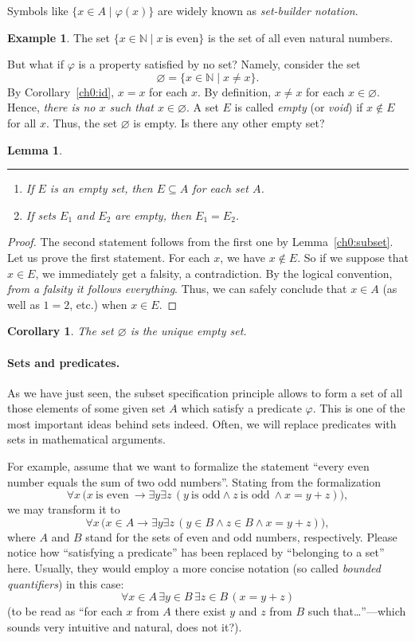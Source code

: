 \documentclass[12pt,notitlepage]{article}
\theoremstyle{plain}
\newtheorem{lemma}[thm]{Lemma}
\newtheorem{corr}[thm]{Corollary}
\theoremstyle{definition}
\newtheorem{exm}[thm]{Example}
\theoremstyle{plain}
\newcommand{\N}{\mathbb{N}}
\newcommand{\sbs}{\subseteq}
\newcommand{\void}{\varnothing}
\renewcommand{\phi}{\varphi}
\newcommand{\1}{\mathbf{1}}
\newcommand{\0}{\mathbf{0}}
\begin{document}
Symbols like $\{x \in A \mid \phi(x)\}$ are widely known as \emph{set-builder notation}.

\begin{exm}
The set
$\{ x \in \N \mid x\ \mbox{is even} \}$
is the set of all even natural numbers.
\end{exm}

But what if $\phi$ is a property satisfied by no set? Namely, consider the set
$$\void = \{ x \in \N \mid x \neq x \}.$$
By Corollary~\ref{ch0:id}, $x = x$ for each $x$. By definition, $x \neq x$ for each $x \in \void$. Hence, \emph{there is no $x$ such that $x \in \void$}. A set $E$ is called \emph{empty} (or \emph{void}) if $x \notin E$ for all $x$. Thus, the set $\void$ is empty. Is there any other empty set?
\begin{lemma}\label{ch0:empty}\rule{1pt}{0pt}
\begin{enumerate}
\item If $E$ is an empty set, then $E \sbs A$ for each set $A$.
\item If sets $E_1$ and $E_2$ are empty, then $E_1 = E_2$.
\end{enumerate}
\end{lemma} 
\begin{proof}
The second statement follows from the first one by Lemma~\ref{ch0:subset}. Let us prove the first statement. For each $x$, we have $x \notin E$. So if we suppose that $x \in E$, we immediately get a falsity, a contradiction. By the logical convention, \emph{from a falsity it follows everything}. Thus, we can safely conclude that $x \in A$ (as well as $1 = 2$, etc.) when $x \in E$.
\end{proof}
\begin{corr}
The set $\void$ is the unique empty set.
\end{corr}

\paragraph{Sets and predicates.}
As we have just seen, the subset specification principle allows to form a set of all those elements of some given set $A$ which satisfy a predicate $\phi$. This is one of the most important ideas behind sets indeed. Often, we will replace predicates with sets in mathematical arguments.

For example, assume that we want to formalize the statement ``every even number equals the sum of two odd numbers''. Stating from the formalization $$\forall x\, \bigl(x\ \mbox{is even}\ \to \exists y \exists z\, (y\ \mbox{is odd} \wedge z\ \mbox{is odd}\ \wedge x = y + z)\bigr),$$
we may transform it to
$$\forall x\, \bigl(x \in A \to \exists y \exists z\, (y \in B \wedge z \in B \wedge x = y + z)\bigr),$$
where $A$ and $B$ stand for the sets of even and odd numbers, respectively. Please notice how ``satisfying a predicate'' has been replaced by ``belonging to a set'' here. Usually, they would employ a more concise notation (so called \emph{bounded quantifiers}) in this case:
$$\forall x \in A\, \exists y \in B\,  \exists z \in B\, (x = y + z)$$
(to be read as ``for each $x$ from $A$ there exist $y$ and $z$ from $B$ such that\dots''---which sounds very intuitive and natural, does not it?).
\end{document}
